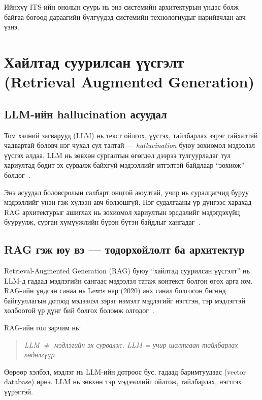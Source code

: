 \documentclass[12pt,A4]{report}
\newcommand{\term}[1]{\textit{#1}}
\begin{document}
Ийнхүү ITS-ийн онолын суурь нь энэ системийн архитектурын үндэс болж байгаа бөгөөд дараагийн бүлгүүдэд системийн технологиудыг нарийвчлан авч үзнэ.


\section{Хайлтад суурилсан үүсгэлт (Retrieval Augmented Generation)}

\subsection{LLM-ийн hallucination асуудал}

Том хэлний загварууд (LLM) нь текст ойлгох, үүсгэх, тайлбарлах зэрэг гайхалтай чадвартай боловч нэг чухал сул талтай --- \term{hallucination} буюу зохиомол мэдээлэл үүсгэх алдаа. LLM нь зөвхөн сургалтын өгөгдөл дээрээ тулгуурладаг тул хариултад бодит эх сурвалж байхгүй мэдээллийг итгэлтэй байдлаар ``зохиож'' болдог~\cite{gao2024}.

Энэ асуудал боловсролын салбарт онцгой аюултай, учир нь суралцагчид буруу мэдээллийг үнэн гэж хүлээн авч болзошгүй. Нэг судалгааны үр дүнгээс харахад RAG архитектурыг ашиглах нь зохиомол хариултын эрсдэлийг мэдэгдэхүйц бууруулж, сурган хүмүүжлийн бүрэн бүтэн байдлыг хангадаг~\cite{liu2025}.

\subsection{RAG гэж юу вэ --- тодорхойлолт ба архитектур}

Retrieval-Augmented Generation (RAG) буюу ``хайлтад суурилсан үүсгэлт'' нь LLM-д гадаад мэдлэгийн сангаас мэдээлэл татаж контекст болгон өгөх арга юм. RAG-ийн үндсэн санаа нь Lewis нар (2020) анх санал болгосон бөгөөд байгууллагын дотоод мэдээлэл зэрэг нэмэлт мэдлэгийг нэгтгэн, тэр мэдлэгтэй холбоотой үр дүнг бий болгох боломж олгодог~\cite{lewis2020,springer2025}.

RAG-ийн гол зарчим нь:

\begin{quote}
\textit{LLM $\neq$ мэдлэгийн эх сурвалж. \quad LLM = учир шалтгаан тайлбарлах хөдөлгүүр.}
\end{quote}

Өөрөөр хэлбэл, мэдлэг нь LLM-ийн дотроос бус, гадаад баримтуудаас (vector database) ирнэ. LLM нь зөвхөн тэр мэдээллийг ойлгож, тайлбарлах, нэгтгэх үүрэгтэй.
\end{document}
